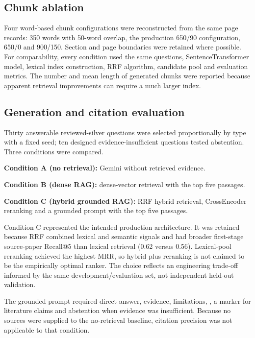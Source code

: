 \documentclass[11pt,a4paper]{article}
\newcommand{\code}[1]{\texttt{\detokenize{#1}}}
\begin{document}
\subsection{Chunk ablation}
\label{sec:chunk-ablation}

Four word-based chunk configurations were reconstructed from the same page records: 350 words with 50-word overlap, the production 650/90 configuration, 650/0 and 900/150. Section and page boundaries were retained where possible. For comparability, every condition used the same questions, SentenceTransformer model, lexical index construction, RRF algorithm, candidate pool and evaluation metrics. The number and mean length of generated chunks were reported because apparent retrieval improvements can require a much larger index.

\subsection{Generation and citation evaluation}
\label{sec:generation-and-citation-evaluation}

Thirty answerable reviewed-silver questions were selected proportionally by type with a fixed seed; ten designed evidence-insufficient questions tested abstention. Three conditions were compared.

\textbf{Condition A (no retrieval):} Gemini without retrieved evidence.

\textbf{Condition B (dense RAG):} dense-vector retrieval with the top five passages.

\textbf{Condition C (hybrid grounded RAG):} RRF hybrid retrieval, CrossEncoder reranking and a grounded prompt with the top five passages.

Condition C represented the intended production architecture. It was retained because RRF combined lexical and semantic signals and had broader first-stage source-paper Recall@5 than lexical retrieval (0.62 versus 0.56). Lexical-pool reranking achieved the highest MRR, so hybrid plus reranking is not claimed to be the empirically optimal ranker. The choice reflects an engineering trade-off informed by the same development/evaluation set, not independent held-out validation.

The grounded prompt required direct answer, evidence, limitations, \code{Sources used}, a \code{[n]} marker for literature claims and abstention when evidence was insufficient. Because no sources were supplied to the no-retrieval baseline, citation precision was not applicable to that condition.
\end{document}
